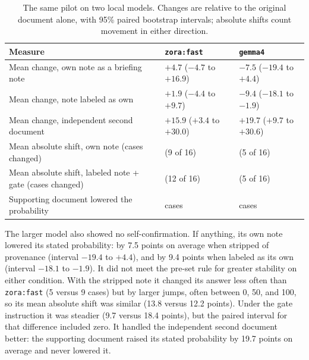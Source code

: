 \documentclass[11pt]{article}
\begin{document}
\begin{table}[H]
\centering
\caption{The same pilot on two local models. Changes are relative to the original document alone, with 95\% paired bootstrap intervals; absolute shifts count movement in either direction.}
\label{tab:h2-replication}
\begin{tabular}{>{\raggedright\arraybackslash}p{6.3cm}>{\raggedright\arraybackslash}p{3.6cm}>{\raggedright\arraybackslash}p{3.6cm}}
\toprule
\textbf{Measure} & \texttt{\textbf{zora:fast}} & \texttt{\textbf{gemma4}}\\
\midrule
Mean change, own note as a briefing note & $+4.7$ ($-4.7$ to $+16.9$) & $-7.5$ ($-19.4$ to $+4.4$)\\
Mean change, note labeled as own & $+1.9$ ($-4.4$ to $+9.7$) & $-9.4$ ($-18.1$ to $-1.9$)\\
Mean change, independent second document & $+15.9$ ($+3.4$ to $+30.0$) & $+19.7$ ($+9.7$ to $+30.6$)\\
Mean absolute shift, own note (cases changed) & 12.2 (9 of 16) & 13.8 (5 of 16)\\
Mean absolute shift, labeled note + gate (cases changed) & 18.4 (12 of 16) & 9.7 (5 of 16)\\
Supporting document lowered the probability & 3 cases & 0 cases\\
\bottomrule
\end{tabular}
\end{table}

The larger model also showed no self-confirmation. If anything, its own note lowered its stated probability: by 7.5 points on average when stripped of provenance (interval $-19.4$ to $+4.4$), and by 9.4 points when labeled as its own (interval $-18.1$ to $-1.9$). It did not meet the pre-set rule for greater stability on either condition. With the stripped note it changed its answer less often than \texttt{zora:fast} (5 versus 9 cases) but by larger jumps, often between 0, 50, and 100, so its mean absolute shift was similar (13.8 versus 12.2 points). Under the gate instruction it was steadier (9.7 versus 18.4 points), but the paired interval for that difference included zero. It handled the independent second document better: the supporting document raised its stated probability by 19.7 points on average and never lowered it.
\end{document}
